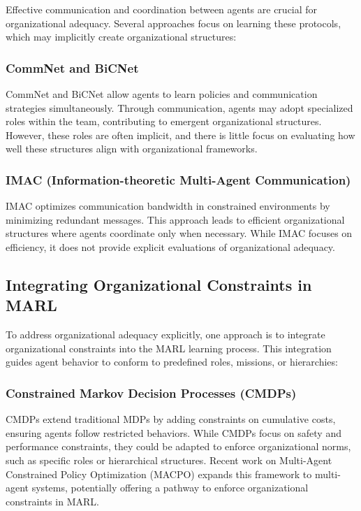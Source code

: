 \documentclass[sigconf,anonymous]{aamas}
\begin{document}
Effective communication and coordination between agents are crucial for organizational adequacy. Several approaches focus on learning these protocols, which may implicitly create organizational structures:

\subsubsection{CommNet and BiCNet}
CommNet \cite{sukhbaatar2016learning} and BiCNet \cite{peng2017multiagent} allow agents to learn policies and communication strategies simultaneously. Through communication, agents may adopt specialized roles within the team, contributing to emergent organizational structures. However, these roles are often implicit, and there is little focus on evaluating how well these structures align with organizational frameworks.

\subsubsection{IMAC (Information-theoretic Multi-Agent Communication)}
IMAC \cite{kim2020communication} optimizes communication bandwidth in constrained environments by minimizing redundant messages. This approach leads to efficient organizational structures where agents coordinate only when necessary. While IMAC focuses on efficiency, it does not provide explicit evaluations of organizational adequacy.

\subsection{Integrating Organizational Constraints in MARL}

To address organizational adequacy explicitly, one approach is to integrate organizational constraints into the MARL learning process. This integration guides agent behavior to conform to predefined roles, missions, or hierarchies:

\subsubsection{Constrained Markov Decision Processes (CMDPs)}
CMDPs \cite{altman1999constrained} extend traditional MDPs by adding constraints on cumulative costs, ensuring agents follow restricted behaviors. While CMDPs focus on safety and performance constraints, they could be adapted to enforce organizational norms, such as specific roles or hierarchical structures. Recent work on Multi-Agent Constrained Policy Optimization (MACPO) \cite{le2022multi} expands this framework to multi-agent systems, potentially offering a pathway to enforce organizational constraints in MARL.
\end{document}
